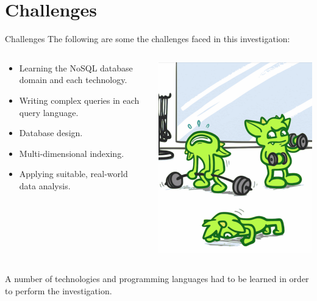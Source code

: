 \section{Challenges}

\begin{frame}{Challenges}
    The following are some the challenges faced in this investigation:
    \vfill
    \begin{columns}
        \begin{column}{.6\textwidth}
            \begin{itemize}
                \item Learning the NoSQL database domain and each technology.
                \item Writing complex queries in each query language.
                \item Database design.
                \item Multi-dimensional indexing.
                \item Applying suitable, real-world data analysis.
            \end{itemize}
            \end{column}%
            \hfill%
            \begin{column}{.39\textwidth}
            \centering
            \includegraphics[width=0.7\columnwidth]{img/gremlin-images/gremlin-gym-crop.png}
        \end{column}%
    \end{columns}
    \vfill
    A number of technologies and programming languages had to be learned in order to perform the investigation.
    \vfill
    \parnotes
\end{frame}

